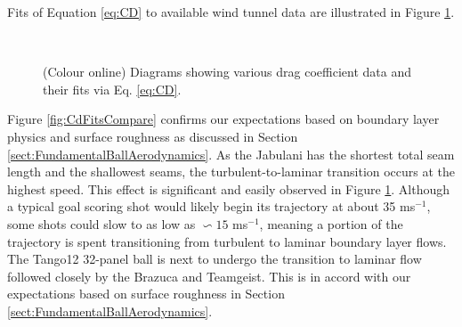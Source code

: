 \documentclass[a4paper]{article}
\begin{document}
Fits of Equation \ref{eq:CD} to available wind tunnel data are illustrated in Figure \ref{fig:CdFits}.
%
%
\begin{figure}[th!!] 
  \begin{center} 
  \captionsetup[subfigure]{width=0.42\textwidth}
   \\  
%
 \end{center}
\vspace{-0.5cm}
 \caption{(Colour online) Diagrams showing various drag coefficient data and their fits via Eq. \ref{eq:CD}.}
 \label{fig:CdFits}
\end{figure}
%
Figure \ref{fig:CdFitsCompare} confirms our expectations based on boundary layer physics and surface roughness as discussed in Section \ref{sect:FundamentalBallAerodynamics}.  As the Jabulani has the shortest total seam length and the shallowest seams, the turbulent-to-laminar transition occurs at the highest speed.  This effect is significant and easily observed in Figure \ref{fig:CdFits}.  Although a typical goal scoring shot would likely begin its trajectory at about 35 ms$^{-1}$, some shots could slow to as low as $\backsim 15$ ms$^{-1}$, meaning a portion of the trajectory is spent transitioning from turbulent to laminar boundary layer flows.  The Tango12 32-panel ball is next to undergo the transition to laminar flow followed closely by the Brazuca and Teamgeist.  This is in accord with our expectations based on surface roughness in Section \ref{sect:FundamentalBallAerodynamics}.  
\end{document}
